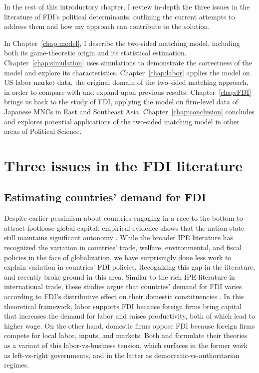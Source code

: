 In the rest of this introductory chapter, I review in-depth the three issues in
the literature of FDI's political determinants, outlining the current attempts
to address them and how my approach can contribute to the solution.

In Chapter~\ref{chap:model}, I describe the two-sided matching model, including
both its game-theoretic origin and its statistical estimation.
Chapter~\ref{chap:simulation} uses simulations to demonstrate the correctness of
the model and explore its characteristics. Chapter~\ref{chap:labor} applies the
model on US labor market data, the original domain of the two-sided matching
approach, in order to compare with and expand upon previous results.
Chapter~\ref{chap:FDI} brings us back to the study of FDI, applying the model on
firm-level data of Japanese MNCs in East and Southeast Asia.
Chapter~\ref{chap:conclusion} concludes and explores potential applications of
the two-sided matching model in other areas of Political Science.

\section{Three issues in the FDI literature}
\label{sec:literature_issues}

\subsection{Estimating countries' demand for FDI}

Despite earlier pessimism about countries engaging in a race to the bottom to
attract footloose global capital, empirical evidence shows that the nation-state
still maintains significant autonomy \citep{Drezner2001}. While the broader IPE
literature has recognized the variation in countries' trade, welfare,
environmental, and fiscal policies in the face of globalization, we have
surprisingly done less work to explain variation in countries' FDI policies.
Recognizing this gap in the literature, \citet{Pinto2013} and \citet{Pandya2016}
recently broke ground in this area. Similar to the rich IPE literature in
international trade, these studies argue that countries' demand for FDI varies
according to FDI's distributive effect on their domestic constituencies
\citep{Broz2001, Milner2005a}. In this theoretical framework, labor supports FDI
because foreign firms bring capital that increases the demand for labor and
raises productivity, both of which lead to higher wage. On the other hand,
domestic firms oppose FDI because foreign firms compete for local labor, inputs,
and markets. Both \citet{Pinto2013} and \citet{Pandya2016} formulate their
theories as a variant of this labor-vs-business tension, which surfaces in the
former work as left-vs-right governments, and in the latter as
democratic-vs-authoritarian regimes.

